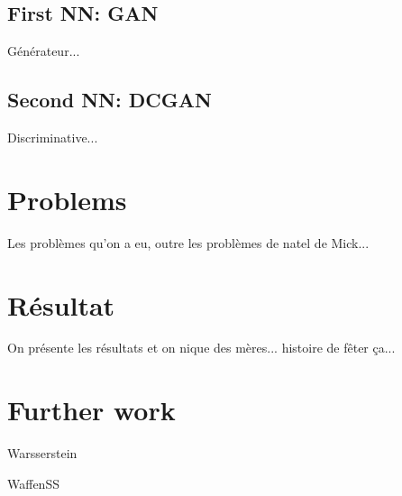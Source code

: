 \documentclass[
  10pt, 
  a4paper,
  oneside, 
  headinclude, 
  footinclude, 
  BCOR5mm, 
]{scrartcl}
\begin{document}
\subsection{First NN: GAN}

Générateur...

\subsection{Second NN: DCGAN}

Discriminative...


\section{Problems}

Les problèmes qu'on a eu, outre les problèmes de natel de Mick...


\section{Résultat}

On présente les résultats et on nique des mères... histoire de fêter ça...


\section{Further work}

Warsserstein

WaffenSS


\newpage

\tableofcontents
\listoffigures
\listoftables

\begin{thebibliography}{9}
\end{thebibliography}
\end{document}
